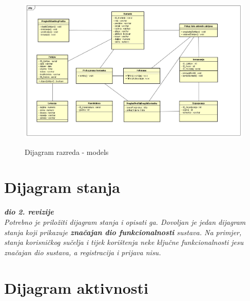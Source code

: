 			\begin{figure}[H]
				\includegraphics[scale=0.8]{slike/classDiagram1.png} %
				\centering
				\caption \newline Dijagram razreda - models
				\label{fig:promjene}
			\end{figure}

			
			\eject
		
		\section{Dijagram stanja}
			
			
			\textbf{\textit{dio 2. revizije}}\\
			
			\textit{Potrebno je priložiti dijagram stanja i opisati ga. Dovoljan je jedan dijagram stanja koji prikazuje \textbf{značajan dio funkcionalnosti} sustava. Na primjer, stanja korisničkog sučelja i tijek korištenja neke ključne funkcionalnosti jesu značajan dio sustava, a registracija i prijava nisu. }
			
			
			\eject 
		
		\section{Dijagram aktivnosti}
			
